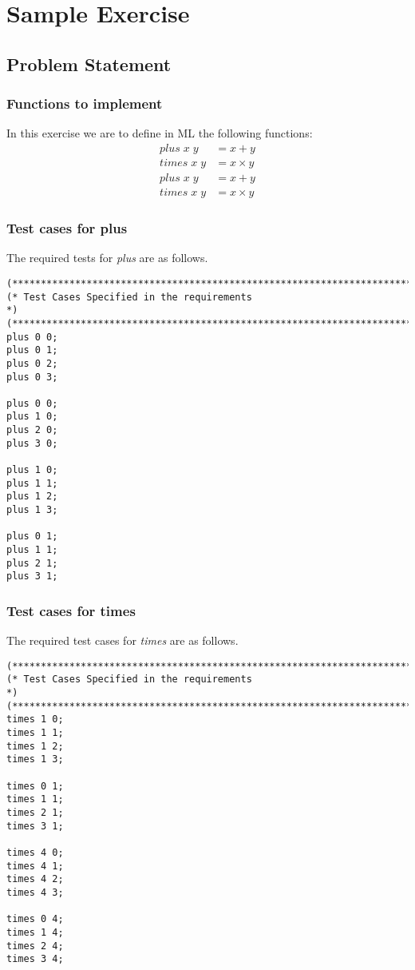 \documentclass{report}
\begin{document}
\chapter{Sample Exercise}
\label{cha:sample-exercise}

\section{Problem Statement}
\label{sec:problem-statement}

\subsection{Functions to implement}
\label{sec:functions-implement}

In this exercise we are to define in ML the following functions:
\begin{align}
  plus \;x \;y &= x + y\\
  times \;x\;y &= x \times y\\
  plus \;x\;y &= x + y\\
  times \;x\;y &= x \times y
\end{align}

\subsection{Test cases for plus}
\label{sec:test-cases-plus}

The required tests for \emph{plus} are as follows.
\begin{lstlisting}[frame=TB]
(******************************************************************************)
(* Test Cases Specified in the requirements                                   *)
(******************************************************************************)
plus 0 0;
plus 0 1;
plus 0 2;
plus 0 3;

plus 0 0;
plus 1 0;
plus 2 0;
plus 3 0;

plus 1 0;
plus 1 1;
plus 1 2;
plus 1 3;

plus 0 1;
plus 1 1;
plus 2 1;
plus 3 1;
 \end{lstlisting}

\subsection{Test cases for times}
\label{sec:test-cases-times}

The required test cases for \emph{times} are as follows.
\begin{lstlisting}[frame = TB]
(******************************************************************************)
(* Test Cases Specified in the requirements                                   *)
(******************************************************************************)
times 1 0;
times 1 1;
times 1 2;
times 1 3;

times 0 1;
times 1 1;
times 2 1;
times 3 1;

times 4 0;
times 4 1;
times 4 2;
times 4 3;

times 0 4;
times 1 4;
times 2 4;
times 3 4;  
\end{lstlisting}
\end{document}
